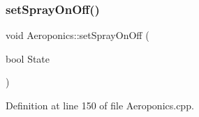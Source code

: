 \mbox{\label{class_aeroponics_a459d83fc32d3369938be2953138c9b96}} 
\subsubsection{\texorpdfstring{set\+Spray\+On\+Off()}{setSprayOnOff()}\hspace{0.1cm}{\footnotesize\ttfamily [2/2]}}
{\footnotesize\ttfamily void Aeroponics\+::set\+Spray\+On\+Off (\begin{DoxyParamCaption}\item[{bool}]{State }\end{DoxyParamCaption})\hspace{0.3cm}{\ttfamily [protected]}}



Definition at line 150 of file Aeroponics.\+cpp.

